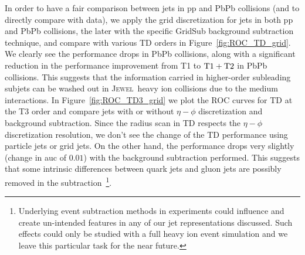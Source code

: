 \documentclass[notoc,preprintnumbers]{JHEP3}
\newcommand{\jw}{\textsc{Jewel}~}
\begin{document}
In order to have a fair comparison between jets in pp and PbPb collisions (and to directly compare with data), we apply the grid discretization for jets in both pp and PbPb collisions, the later with the specific GridSub background subtraction technique, and compare with various TD orders in Figure~\ref{fig:ROC_TD_grid}. We clearly see the performance drops in PbPb collisions, along with a significant reduction in the performance improvement from T1 to $\rm T1+T2$ in PbPb collisions. This suggests that the information carried in higher-order subleading subjets can be washed out in \jw heavy ion collisions due to the medium interactions. In Figure~\ref{fig:ROC_TD3_grid} we plot the ROC curves for TD at the T3 order and compare jets with or without $\eta-\phi$ discretization and background subtraction. Since the radius scan in TD respects the $\eta-\phi$ discretization resolution, we don't see the change of the TD performance using particle jets or grid jets. On the other hand, the performance drops very slightly (change in auc of $0.01$) with the background subtraction performed. This suggests that some intrinsic differences between quark jets and gluon jets are possibly removed in the subtraction~\footnote{Underlying event subtraction methods in experiments could influence and create un-intended features in any of our jet representations discussed. Such effects could only be studied with a full heavy ion event simulation and we leave this particular task for the near future.}.
\end{document}
